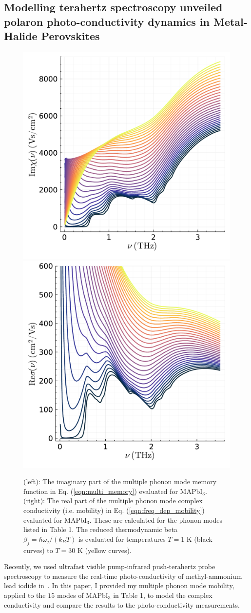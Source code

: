 \subsection{Modelling terahertz spectroscopy unveiled polaron photo-conductivity dynamics in Metal-Halide Perovskites}

\begin{figure}[t]
    \centering
    \includegraphics[width=.49\textwidth]{figures/zero_mem.pdf}
    \includegraphics[width=.49\textwidth]{figures/zero_conduct.pdf}
    
    \caption{(left): The imaginary part of the multiple phonon mode memory function in Eq. (\ref{eqn:multi_memory}) evaluated for MAPbI$_3$. (right): The real part of the multiple phonon mode complex conductivity (i.e. mobility) in Eq. (\ref{eqn:freq_dep_mobility}) evaluated for MAPbI$_3$. These are calculated for the phonon modes listed in Table 1. The reduced thermodynamic beta $\beta_j = \hbar \omega_j / (k_B T)$ is evaluated for temperatures $T = 1$ K (black curves) to $T = 30$ K (yellow curves).}
    \label{fig:athermal_thz}
\end{figure}

Recently, we used ultrafast visible pump-infrared push-terahertz probe spectroscopy to measure the real-time photo-conductivity of methyl-ammonium lead iodide in~\cite{zheng_multipulse_2021}. In this paper, I provided my multiple phonon mode mobility, applied to the $15$ modes of MAPbI$_3$ in Table 1, to model the complex conductivity and compare the results to the photo-conductivity measurements. 

